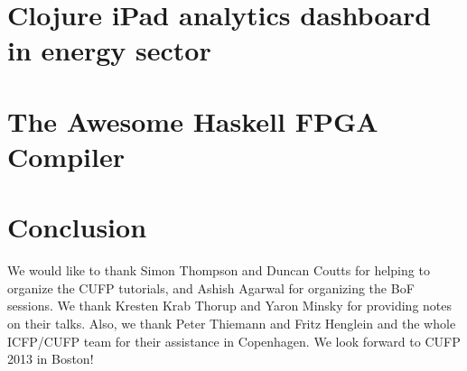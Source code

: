 \documentclass{jfp1}
\begin{document}
\section{Clojure iPad analytics dashboard in energy sector}

\section{The Awesome Haskell FPGA Compiler}

\section{Conclusion}

We would like to thank Simon Thompson and Duncan Coutts for helping to
organize the CUFP tutorials, and Ashish Agarwal for organizing the BoF
sessions.  We thank Kresten Krab Thorup and Yaron Minsky for providing
notes on their talks.  Also, we thank Peter Thiemann and Fritz Henglein and the
whole ICFP/CUFP team for their assistance in Copenhagen.  We look
forward to CUFP 2013 in Boston!


\end{document}
